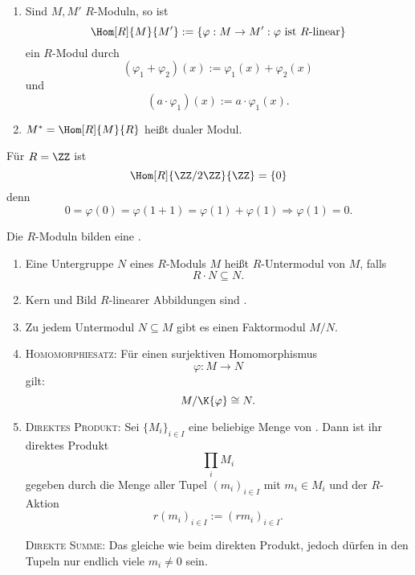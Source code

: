 \begin{BemDef}
\begin{enumerate}
\item Sind $M,M'$ $R$-Moduln, so ist
\[
\Hom[R]{M}{M'} := \{\varphi: M \to M' : \varphi \text{ ist } R\text{-linear}\}
\]
ein $R$-Modul durch 
\[
(\varphi_1 + \varphi_2)(x) := \varphi_1(x) + \varphi_2(x) 
\]
und
\[
(a \cdot \varphi_1)(x) := a \cdot \varphi_1(x).
\]
\item $M^* = \Hom[R]{M}{R}$ heißt dualer Modul.
\end{enumerate}
\end{BemDef}

\newcommand{\BIGOP}[1]{\mathop{\mathchoice%
{\raise-0.22em\hbox{\huge $#1$}}%
{\raise-0.05em\hbox{\Large $#1$}}{\hbox{\large $#1$}}{#1}}}
\newcommand{\bigtimes}{\BIGOP{\times}} 

\begin{nnBsp}
Für $R = \ZZ$ ist 
\[
\Hom[R]{\ZZ/2\ZZ}{\ZZ} = \{ 0\}
\]
denn
\[
0 = \varphi(0) = \varphi(1 + 1) = \varphi(1)+\varphi(1) \Rightarrow \varphi(1) =
0.
\]
\end{nnBsp}

\begin{Bem}
Die $R$-Moduln bilden eine  .
\begin{enumerate}
\item Eine Untergruppe $N$ eines $R$-Moduls $M$ heißt $R$-Untermodul von
$M$, falls 
\[
R \cdot N \subseteq N.
\]
\item Kern und Bild $R$-linearer Abbildungen sind \RMods.
\item Zu jedem Untermodul $N \subseteq M$ gibt es einen Faktormodul $M/N$.
\item \textsc{Homomorphiesatz:} Für einen surjektiven Homomorphismus
\[
\varphi: M \to N 
\]
gilt:
\[
M/\K{\varphi} \cong N.
\]
\item \textsc{Direktes Produkt:} Sei ${\{M_{i}\}}_{i \in I}$ eine beliebige
Menge von \RMods.
Dann ist ihr direktes Produkt
\[
\prod_i M_i
\]
 gegeben durch die Menge aller Tupel ${(m_i)}_{i
\in I}$ mit $m_i \in M_i$ und der $R$-Aktion 
\[
{r(m_i)}_{i \in I} := {(rm_i)}_{i \in I}.
\]

\textsc{Direkte Summe:} Das gleiche wie beim direkten Produkt, jedoch dürfen in den 
Tupeln nur endlich viele $m_i \neq 0$ sein.
\end{enumerate}
\end{Bem}

